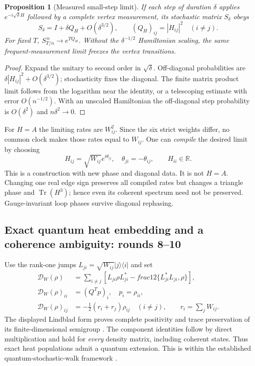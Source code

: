\documentclass[11pt,a4paper]{article}
\newtheorem{proposition}[theorem]{Proposition}
\newcommand{\Tr}{\operatorname{Tr}}
\begin{document}
\begin{proposition}[Measured small-step limit]
If each step of duration $\delta$ applies $e^{-i\sqrt\delta H}$ followed
by a complete vertex measurement, its stochastic matrix $S_\delta$ obeys
\[
 S_\delta=I+\delta Q_H+O(\delta^{3/2}),\qquad
 (Q_H)_{ij}=|H_{ij}|^2\quad(i\ne j).
\]
For fixed $T$, $S_{T/n}^{\,n}\to e^{TQ_H}$. Without the
$\delta^{-1/2}$ Hamiltonian scaling, the same frequent-measurement limit
freezes the vertex transitions.
\end{proposition}
\begin{proof}
Expand the unitary to second order in $\sqrt\delta$. Off-diagonal
probabilities are $\delta|H_{ij}|^2+O(\delta^{3/2})$; stochasticity fixes
the diagonal. The finite matrix product limit follows from the logarithm
near the identity, or a telescoping estimate with error $O(n^{-1/2})$.
With an unscaled Hamiltonian the off-diagonal step probability is
$O(\delta^2)$ and $n\delta^2\to0$.
\end{proof}

For $H=A$ the limiting rates are $W_{ij}^2$. Since the six strict weights
differ, no common clock makes those rates equal to $W_{ij}$. One can
\emph{compile} the desired limit by choosing
\[
 H_{ij}=\sqrt{W_{ij}}e^{i\theta_{ij}},\quad
 \theta_{ji}=-\theta_{ij},\qquad H_{ii}\in\mathbb R.
\]
This is a construction with new phase and diagonal data. It is not
$H=A$. Changing one real edge sign preserves all compiled rates but changes
a triangle phase and $\Tr(H^3)$; hence even its coherent spectrum need not
be preserved. Gauge-invariant loop phases survive diagonal rephasing.

\subsection{Exact quantum heat embedding and a coherence ambiguity: rounds 8--10}

Use the rank-one jumps $L_{ji}=\sqrt{W_{ij}}|j\rangle\langle i|$ and set
\begin{align}
 \mathcal D_W(\rho)&=\sum_{i\ne j}\left[
 L_{ji}\rho L_{ji}^*-	frac12\{L_{ji}^*L_{ji},\rho\}\right],\\
 \mathcal D_W(\rho)_{ii}&=(Q^Tp)_i,\quad p_i=\rho_{ii},\\
 \mathcal D_W(\rho)_{ij}&=-\tfrac12(r_i+r_j)\rho_{ij}\quad(i\ne j),
 \qquad r_i=\sum_jW_{ij}.
\end{align}
The displayed Lindblad form proves complete positivity and trace
preservation of its finite-dimensional semigroup \cite{lindblad}.
The component identities follow by direct multiplication and hold for
\emph{every} density matrix, including coherent states. Thus exact heat
populations admit a quantum extension. This is within the established
quantum-stochastic-walk framework \cite{qsw}.
\end{document}
